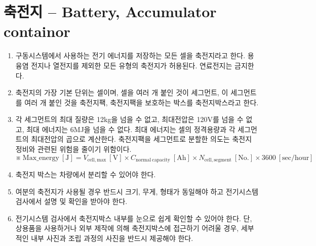 \documentclass[final,a4paper,10pt]{report}
\begin{document}
\section{축전지 – Battery, Accumulator containor} \label{section:축전지}
\begin{enumerate}
  \item 구동시스템에서 사용하는 전기 에너지를 저장하는 모든 셀을 축전지라고 한다. 용융염 전지나 열전지를 제외한 모든 유형의 축전지가 허용된다. 연료전지는 금지한다.
  \item 축전지의 가장 기본 단위는 셀이며, 셀을 여러 개 붙인 것이 세그먼트, 이 세그먼트를 여러 개 붙인 것을 축전지팩, 축전지팩을 보호하는 박스를 축전지박스라고 한다.
  \item 각 세그먼트의 최대 질량은 12kg을 넘을 수 없고, 최대전압은 120V를 넘을 수 없고, 최대 에너지는 6MJ을 넘을 수 없다. 최대 에너지는 셀의 정격용량과 각 세그먼트의 최대전압의 곱으로 계산한다. 축전지팩을 세그먼트로 분할한 의도는 축전지 정비와 관련된 위험을 줄이기 위함이다. \label{item:세그먼트 제한}
    \[
      ※\ \mathrm{Max\_energy\ [J]} = V_{\mathrm{cell,max}}\ [\mathrm{V}] \times C_{\mathrm{normal\ capacity}}\ [\mathrm{Ah}] \times N_{\mathrm{cell,segment}}\ [\mathrm{No.}] \times 3600\ [\mathrm{sec/hour}]
    \]
  \item 축전지 박스는 차량에서 분리할 수 있어야 한다.
  \item 여분의 축전지가 사용될 경우 반드시 크기, 무게, 형태가 동일해야 하고 전기시스템 검사에서 설명 및 확인을 받아야 한다.
  \item 전기시스템 검사에서 축전지박스 내부를 눈으로 쉽게 확인할 수 있어야 한다. 단, 상용품을 사용하거나 외부 제작에 의해 축전지박스에 접근하기 어려울 경우, 세부적인 내부 사진과 조립 과정의 사진을 반드시 제공해야 한다.
  

\end{enumerate}
\end{document}
